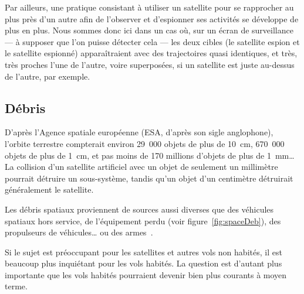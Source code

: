 	Par ailleurs, une pratique consistant à utiliser un satellite pour se rapprocher au plus près d'un autre afin de l'observer et d'espionner ses activités se développe de plus en plus. Nous sommes donc ici dans un cas où, sur un écran de surveillance --- à supposer que l'on puisse détecter cela --- les deux cibles (le satellite espion et le satellite espionné) apparaîtraient avec des trajectoires quasi identiques, et très, très proches l'une de l'autre, voire superposées, si un satellite est juste au-dessus de l'autre, par exemple.
	
	
	\FloatBarrier \subsection{Débris}
	D'après l'Agence spatiale européenne (ESA, d'après son sigle anglophone), l'orbite terrestre compterait environ 29~000 objets de plus de 10~cm, 670~000 objets de plus de 1~cm, et pas moins de 170 millions d'objets de plus de 1~mm\ldots{} La collision d'un satellite artificiel avec un objet de seulement un millimètre pourrait détruire un sous-système, tandis qu'un objet d'un centimètre détruirait généralement le satellite\footnotemark.
	
	Les débris spatiaux proviennent de sources aussi diverses que des véhicules spatiaux hors service, de l'équipement perdu (voir figure~\ref{fig:spaceDeb}), des propulseurs de véhicules\ldots{} ou des armes\footnotemark~\cite{chun1999shooting}.
	
	
	Si le sujet est préoccupant pour les satellites et autres vols non habités, il est beaucoup plus inquiétant pour les vols habités. La question est d'autant plus importante que les vols habités pourraient devenir bien plus courants à moyen terme\footnotemark.
	
	
